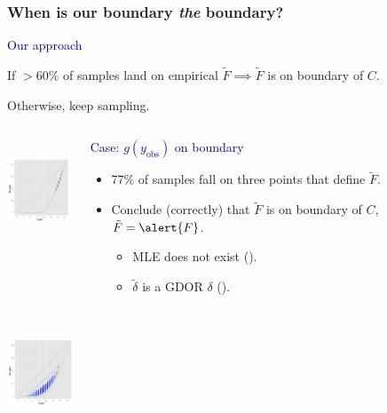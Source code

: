 \documentclass[ 10pt]{beamer}
\newcommand{\yobs}{y_{\text{obs}}}
\begin{document}
\frame
{
\frametitle{When is our boundary \emph{the} boundary?}  

\textcolor{darkblue}{Our approach} 

If $>60\%$ of samples land on empirical $\tilde{F} \implies \tilde{F}$ is on boundary of $C$.  

Otherwise, keep sampling.
\vspace{1mm}

\begin{columns}[]
\begin{column}[T]{0.22\textwidth}
\centering
\includegraphics[width = 0.8in, height=1.2in, trim=3.5in 1.9in 0.3in 0.5in, clip = true ]{MCsample-77face} %
\end{column}

\begin{column}[t]{0.78\textwidth}

\pause
\textcolor{darkblue}{Case: $g(\yobs)$ on boundary}
\begin{itemize}
\item 77\% of samples fall on three points that define $\tilde{F}$.
\item Conclude (correctly) that $\tilde{F}$ is on boundary of $C$, $\tilde{F} = \alert{F}$.
\begin{itemize}
\item MLE does not exist (\alert{\checkmark}).
\item $\tilde{\delta}$ is a GDOR $\delta$ (\alert{\checkmark}).
\end{itemize}
\end{itemize}

\end{column}
\end{columns}
\vspace{5mm}

\begin{columns}[]
\begin{column}[T]{0.22\textwidth}
\centering
\includegraphics[width = 0.8in, height=1.2in, trim=2.9in 0.9in 0.9in 1.5in, clip = true ]{MCsample-interiorptonF} %


\end{column}
\end{columns}}
\end{document}
